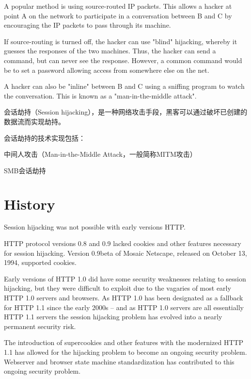 A popular method is using source-routed IP packets. This allows a hacker at point A on the network to participate in a conversation between B and C by encouraging the IP packets to pass through its machine.

If source-routing is turned off, the hacker can use "blind" hijacking, whereby it guesses the responses of the two machines. Thus, the hacker can send a command, but can never see the response. However, a common command would be to set a password allowing access from somewhere else on the net.

A hacker can also be "inline" between B and C using a sniffing program to watch the conversation. This is known as a "man-in-the-middle attack".

会话劫持（Session hijacking），是一种网络攻击手段，黑客可以通过破坏已创建的数据流而实现劫持。

会话劫持的技术实现包括：

\begin{compactitem}
\item 中间人攻击（Man-in-the-Middle Attack，一般简称MITM攻击）
\item SMB会话劫持
\end{compactitem}


\section{History}

Session hijacking was not possible with early versions HTTP.

HTTP protocol versions 0.8 and 0.9 lacked cookies and other features necessary for session hijacking. Version 0.9beta of Mosaic Netscape, released on October 13, 1994, supported cookies.

Early versions of HTTP 1.0 did have some security weaknesses relating to session hijacking, but they were difficult to exploit due to the vagaries of most early HTTP 1.0 servers and browsers. As HTTP 1.0 has been designated as a fallback for HTTP 1.1 since the early 2000s -- and as HTTP 1.0 servers are all essentially HTTP 1.1 servers the session hijacking problem has evolved into a nearly permanent security risk.

The introduction of supercookies and other features with the modernized HTTP 1.1 has allowed for the hijacking problem to become an ongoing security problem. Webserver and browser state machine standardization has contributed to this ongoing security problem.









